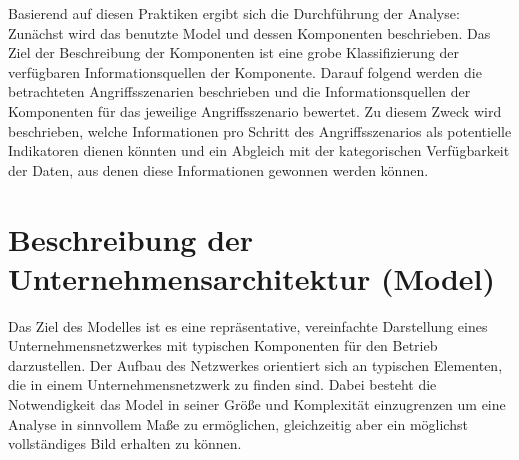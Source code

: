 Basierend auf diesen Praktiken ergibt sich die Durchführung der Analyse: Zunächst wird das benutzte Model und dessen Komponenten beschrieben. Das Ziel der Beschreibung der Komponenten ist eine grobe Klassifizierung der verfügbaren Informationsquellen der Komponente. Darauf folgend werden die betrachteten Angriffsszenarien beschrieben und die Informationsquellen der Komponenten für das jeweilige Angriffsszenario bewertet. Zu diesem Zweck wird beschrieben, welche Informationen pro Schritt des Angriffsszenarios als potentielle Indikatoren dienen könnten und ein Abgleich mit der kategorischen Verfügbarkeit der Daten, aus denen diese Informationen gewonnen werden können.



\section{Beschreibung der Unternehmensarchitektur (Model)}




Das Ziel des Modelles ist es eine repräsentative, vereinfachte Darstellung eines Unternehmensnetzwerkes mit typischen Komponenten für den Betrieb darzustellen. Der Aufbau des Netzwerkes orientiert sich an typischen Elementen, die in einem Unternehmensnetzwerk zu finden sind. Dabei besteht die Notwendigkeit das Model in seiner Größe und Komplexität einzugrenzen um eine Analyse in sinnvollem Maße zu ermöglichen, gleichzeitig aber ein möglichst vollständiges Bild erhalten zu können.

